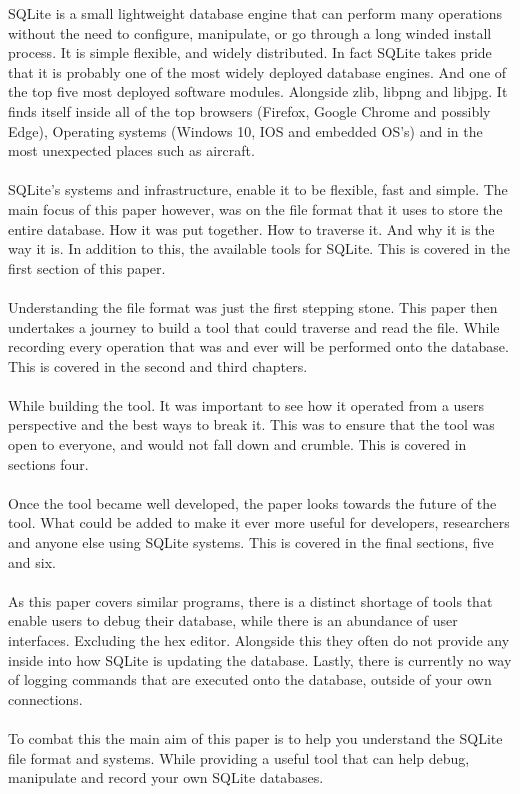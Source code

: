 SQLite is a small lightweight database engine that can perform many operations without the need to configure, manipulate, or go through a long winded install process. It is simple flexible, and widely distributed. In fact SQLite takes pride that it is probably one of the most widely deployed database engines. And one of the top five most deployed software modules. Alongside zlib, libpng and libjpg. It finds itself inside all of the top browsers (Firefox, Google Chrome and possibly Edge), Operating systems (Windows 10, IOS and embedded OS's) and in the most unexpected places such as aircraft.
\\\\
SQLite's systems and infrastructure, enable it to be flexible, fast and simple. The main focus of this paper however, was on the file format that it uses to store the entire database. How it was put together. How to traverse it. And why it is the way it is. In addition to this, the available tools for SQLite. This is covered in the first section of this paper.
\\\\
Understanding the file format was just the first stepping stone. This paper then undertakes a journey to build a tool that could traverse and read the file. While recording every operation that was and ever will be performed onto the database. This is covered in the second and third chapters.
\\\\
While building the tool. It was important to see how it operated from a users perspective and the best ways to break it. This was to ensure that the tool was open to everyone, and would not fall down and crumble. This is covered in sections four. 
\\\\
Once the tool became well developed, the paper looks towards the future of the tool. What could be added to make it ever more useful for developers, researchers and anyone else using SQLite systems. This is covered in the final sections, five and six.
\\\\
As this paper covers similar programs, there is a distinct shortage of tools that enable users to debug their database, while there is an abundance of user interfaces. Excluding the hex editor. Alongside this they often do not provide any inside into how SQLite is updating the database. Lastly, there is currently no way of logging commands that are executed onto the database, outside of your own connections.
\\\\
To combat this the main aim of this paper is to help you understand the SQLite file format and systems. While providing a useful tool that can help debug, manipulate and record your own SQLite databases.